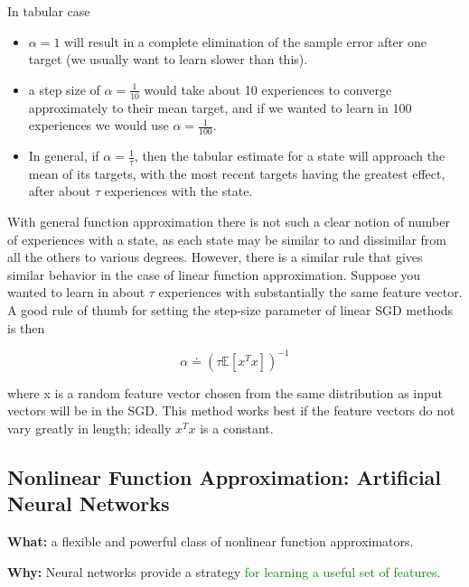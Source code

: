 \documentclass[12pt, a4paper]{article}
\begin{document}
In tabular case
\begin{itemize}
  \item $\alpha = 1$ will result in a complete elimination of the sample error after one target (we usually want to learn slower than this).
  \item a step size of $\alpha = \frac{1}{10}$ would take about 10 experiences to converge approximately to their mean target, and if we wanted to learn in 100 experiences we would use $\alpha = \frac{1}{100}$.
  \item In general, if $\alpha = \frac{1}{\tau}$, then the tabular estimate for a state will approach the mean of its targets, with the most recent targets having the greatest effect, after about $\tau$ experiences with the state.
\end{itemize}

With general function approximation there is not such a clear notion of number of experiences with a state, as each state may be similar to and dissimilar from all the others to various degrees. However, there is a similar rule that gives similar behavior in the case of linear function approximation. Suppose you wanted to learn in about $\tau$ experiences with substantially the same feature vector. A good rule of thumb for setting the step-size parameter of linear SGD methods is then

$$
\alpha \doteq (\tau \mathbb{E}[x^Tx])^{-1}
$$

where x is a random feature vector chosen from the same distribution as input vectors will be in the SGD. This method works best if the feature vectors do not vary greatly in length; ideally $x^Tx$ is a constant.










\subsection{Nonlinear Function Approximation: Artificial Neural Networks}\label{neural-networks}

\textbf{What:} a flexible and powerful class of nonlinear function approximators.

\textbf{Why:} Neural networks provide a strategy \textcolor{Green}{for learning a useful set of features}.
\end{document}

